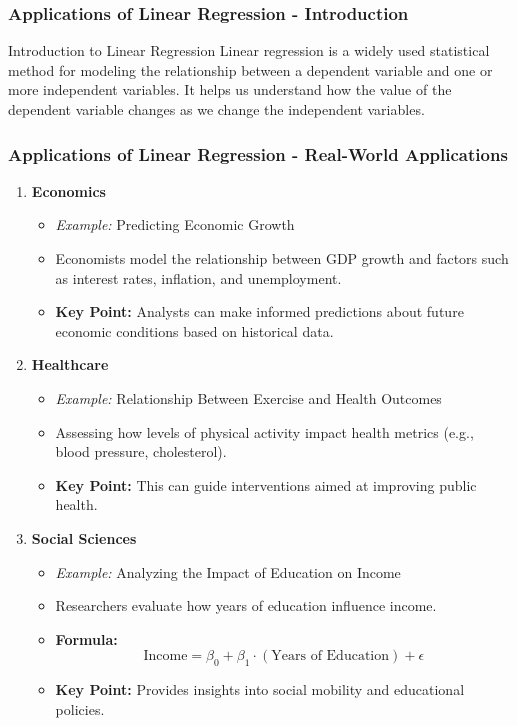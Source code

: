 \documentclass[aspectratio=169]{beamer}
\begin{document}
\begin{frame}[fragile]
    \frametitle{Applications of Linear Regression - Introduction}
    \begin{block}{Introduction to Linear Regression}
        Linear regression is a widely used statistical method for modeling the relationship between a dependent variable and one or more independent variables. 
        It helps us understand how the value of the dependent variable changes as we change the independent variables.
    \end{block}
\end{frame}

\begin{frame}[fragile]
    \frametitle{Applications of Linear Regression - Real-World Applications}
    \begin{enumerate}
        \item \textbf{Economics}
            \begin{itemize}
                \item \textit{Example:} Predicting Economic Growth
                \item Economists model the relationship between GDP growth and factors such as interest rates, inflation, and unemployment.
                \item \textbf{Key Point:} Analysts can make informed predictions about future economic conditions based on historical data.
            \end{itemize}
        
        \item \textbf{Healthcare}
            \begin{itemize}
                \item \textit{Example:} Relationship Between Exercise and Health Outcomes
                \item Assessing how levels of physical activity impact health metrics (e.g., blood pressure, cholesterol).
                \item \textbf{Key Point:} This can guide interventions aimed at improving public health.
            \end{itemize}
        
        \item \textbf{Social Sciences}
            \begin{itemize}
                \item \textit{Example:} Analyzing the Impact of Education on Income
                \item Researchers evaluate how years of education influence income.
                \item \textbf{Formula:} 
                \begin{equation}
                    \text{Income} = \beta_0 + \beta_1 \cdot (\text{Years of Education}) + \epsilon
                \end{equation}
                \item \textbf{Key Point:} Provides insights into social mobility and educational policies.
            \end{itemize}
    \end{enumerate}
\end{frame}
\end{document}
